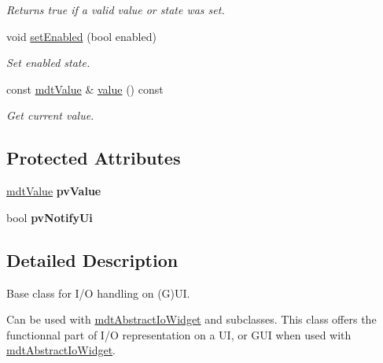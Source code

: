 \begin{DoxyCompactItemize}
\begin{DoxyCompactList}\small\item\em Returns true if a valid value or state was set. \end{DoxyCompactList}\item 
\hypertarget{classmdt_abstract_io_a64f31b1d9abdec6d0b0cc05a2fe1f31b}{
void \hyperlink{classmdt_abstract_io_a64f31b1d9abdec6d0b0cc05a2fe1f31b}{setEnabled} (bool enabled)}
\label{classmdt_abstract_io_a64f31b1d9abdec6d0b0cc05a2fe1f31b}

\begin{DoxyCompactList}\small\item\em Set enabled state. \end{DoxyCompactList}\item 
\hypertarget{classmdt_abstract_io_a839b0d3a4a1d4616e5b20d744c5f75a1}{
const \hyperlink{classmdt_value}{mdtValue} \& \hyperlink{classmdt_abstract_io_a839b0d3a4a1d4616e5b20d744c5f75a1}{value} () const }
\label{classmdt_abstract_io_a839b0d3a4a1d4616e5b20d744c5f75a1}

\begin{DoxyCompactList}\small\item\em Get current value. \end{DoxyCompactList}\end{DoxyCompactItemize}
\subsection*{Protected Attributes}
\begin{DoxyCompactItemize}
\item 
\hypertarget{classmdt_abstract_io_ab955fdb5b2f6491917670a84752b823f}{
\hyperlink{classmdt_value}{mdtValue} {\bfseries pvValue}}
\label{classmdt_abstract_io_ab955fdb5b2f6491917670a84752b823f}

\item 
\hypertarget{classmdt_abstract_io_aa2dc002fc045276fac33f44fb20f6974}{
bool {\bfseries pvNotifyUi}}
\label{classmdt_abstract_io_aa2dc002fc045276fac33f44fb20f6974}

\end{DoxyCompactItemize}


\subsection{Detailed Description}
Base class for I/O handling on (G)UI. 

Can be used with \hyperlink{classmdt_abstract_io_widget}{mdtAbstractIoWidget} and subclasses. This class offers the functionnal part of I/O representation on a UI, or GUI when used with \hyperlink{classmdt_abstract_io_widget}{mdtAbstractIoWidget}. 

